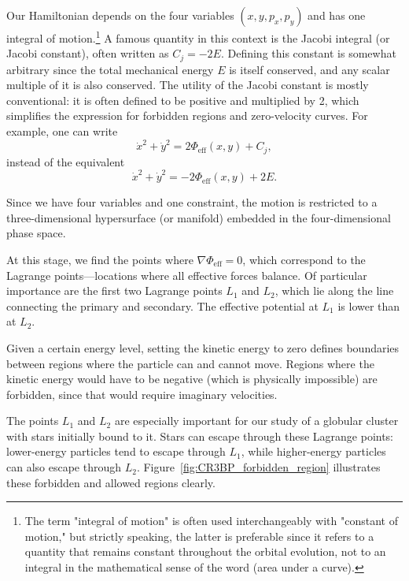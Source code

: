         Our Hamiltonian depends on the four variables \((x, y, p_x, p_y)\) and has one integral of motion.\footnote{The term "integral of motion" is often used interchangeably with "constant of motion," but strictly speaking, the latter is preferable since it refers to a quantity that remains constant throughout the orbital evolution, not to an integral in the mathematical sense of the word (area under a curve).} A famous quantity in this context is the Jacobi integral (or Jacobi constant), often written as \(C_j = -2E\). Defining this constant is somewhat arbitrary since the total mechanical energy \(E\) is itself conserved, and any scalar multiple of it is also conserved. The utility of the Jacobi constant is mostly conventional: it is often defined to be positive and multiplied by 2, which simplifies the expression for forbidden regions and zero-velocity curves. For example, one can write
        \[
        \dot{x}^2 + \dot{y}^2 = 2 \Phi_\mathrm{eff}(x,y) + C_j,
        \]
        instead of the equivalent
        \[
        \dot{x}^2 + \dot{y}^2 = -2 \Phi_\mathrm{eff}(x,y) + 2E.
        \]
        

        Since we have four variables and one constraint, the motion is restricted to a three-dimensional hypersurface (or manifold) embedded in the four-dimensional phase space.

        At this stage, we find the points where \(\nabla \Phi_\mathrm{eff} = 0\), which correspond to the Lagrange points—locations where all effective forces balance. Of particular importance are the first two Lagrange points \(L_1\) and \(L_2\), which lie along the line connecting the primary and secondary. The effective potential at \(L_1\) is lower than at \(L_2\).

        Given a certain energy level, setting the kinetic energy to zero defines boundaries between regions where the particle can and cannot move. Regions where the kinetic energy would have to be negative (which is physically impossible) are forbidden, since that would require imaginary velocities.

        The points \(L_1\) and \(L_2\) are especially important for our study of a globular cluster with stars initially bound to it. Stars can escape through these Lagrange points: lower-energy particles tend to escape through \(L_1\), while higher-energy particles can also escape through \(L_2\). Figure~\ref{fig:CR3BP_forbidden_region} illustrates these forbidden and allowed regions clearly.




